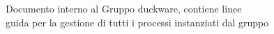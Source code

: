 Documento interno al Gruppo duckware, contiene linee\\ guida per la gestione di tutti i processi instanziati dal gruppo
